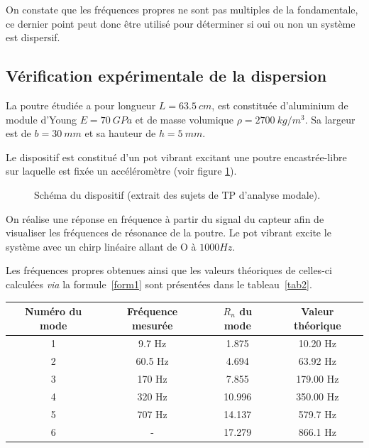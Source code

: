 \documentclass[a4paper,11pt]{report} %
\begin{document}
\bigskip
On constate que les fréquences propres ne sont pas multiples de la fondamentale, ce dernier point peut donc être utilisé pour déterminer si oui ou non un système est dispersif.


\subsection{Vérification expérimentale de la dispersion}
La poutre étudiée a pour longueur $L = 63.5~ cm$, est constituée d'aluminium de module d'Young $E = 70~GPa$ et de masse volumique $\rho = 2700~kg/m^3$. Sa largeur est de $b = 30~mm$ et sa hauteur de $h=5~mm$.

Le dispositif est constitué d'un pot vibrant excitant une poutre encastrée-libre sur laquelle est fixée un accéléromètre (voir figure \ref{schema}). 

\begin{figure}[!h]
\caption{\label{schema} Schéma du dispositif (extrait des sujets de TP d'analyse modale).}
\end{figure}

On réalise une réponse en fréquence à partir du signal du capteur afin de visualiser les fréquences de résonance de la poutre. Le pot vibrant excite le système avec un chirp linéaire allant de O à $1000Hz$.

Les fréquences propres obtenues ainsi que les valeurs théoriques de celles-ci calculées \emph{via} la formule~\ref{form1} sont présentées dans le tableau~\ref{tab2}.

\bigskip
\begin{minipage}[c]{\textwidth}
\centering
\begin{tabular}{c|c|c|c }
Numéro du mode & Fréquence mesurée  & $R_n$ du mode & Valeur théorique \\\hline
1 & 9.7 Hz & 1.875 & 10.20 Hz\\
2 & 60.5 Hz & 4.694 & 63.92 Hz\\
3 & 170 Hz & 7.855 & 179.00 Hz\\
4 & 320 Hz & 10.996 & 350.00 Hz\\
5 & 707 Hz & 14.137 & 579.7 Hz \\
6 & - & 17.279 & 866.1 Hz
\end{tabular}
\end{minipage}
\end{document}
